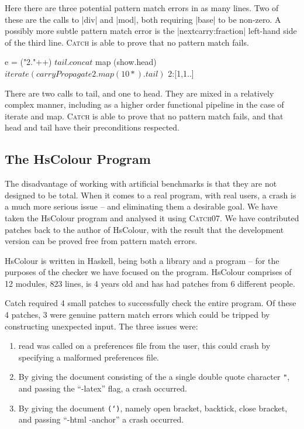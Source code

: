 \documentclass[preprint]{sigplanconf}
\newcommand{\T}[1]{\texttt{#1}}
\newcommand{\C}[1]{\textsf{#1}}
\newcommand{\catch}{\textsc{Catch}}
\begin{document}
Here there are three potential pattern match errors in as many lines. Two of these are the calls to |div| and |mod|, both requiring |base| to be non-zero. A possibly more subtle pattern match error is the |nextcarry:fraction| left-hand side of the third line. \catch{} is able to prove that no pattern match fails.

\begin{code}
e =  ("2."++) $
     tail . concat $
     map (show.head) $
     iterate (carryPropagate 2 . map (10*) . tail) $
     2:[1,1..]
\end{code}

There are two calls to \C{tail}, and one to \C{head}. They are mixed in a relatively complex manner, including as a higher order functional pipeline in the case of \C{iterate} and \C{map}. \catch{} is able to prove that no pattern match fails, and that \C{head} and \C{tail} have their preconditions respected.

\subsection{The HsColour Program}
\label{sec:hscolour}

The disadvantage of working with artificial benchmarks is that they are not designed to be total. When it comes to a real program, with real users, a crash is a much more serious issue -- and eliminating them a desirable goal. We have taken the HsColour program and analysed it using \catch07. We have contributed patches back to the author of HsColour, with the result that the development version can be proved free from pattern match errors.

HsColour is written in Haskell, being both a library and a program -- for the purposes of the checker we have focused on the program. HsColour comprises of 12 modules, 823 lines, is 4 years old and has had patches from 6 different people.

Catch required 4 small patches to successfully check the entire program. Of these 4 patches, 3 were genuine pattern match errors which could be tripped by constructing unexpected input. The three issues were:

\begin{enumerate}
\item \C{read} was called on a preferences file from the user, this could crash by specifying a malformed preferences file.
\item By giving the document consisting of the a single double quote character \T{"}, and passing the ``-latex'' flag, a crash occurred.
\item By giving the document \T{(`)}, namely open bracket, backtick, close bracket, and passing ``-html -anchor'' a crash occurred.
\end{enumerate}
\end{document}
